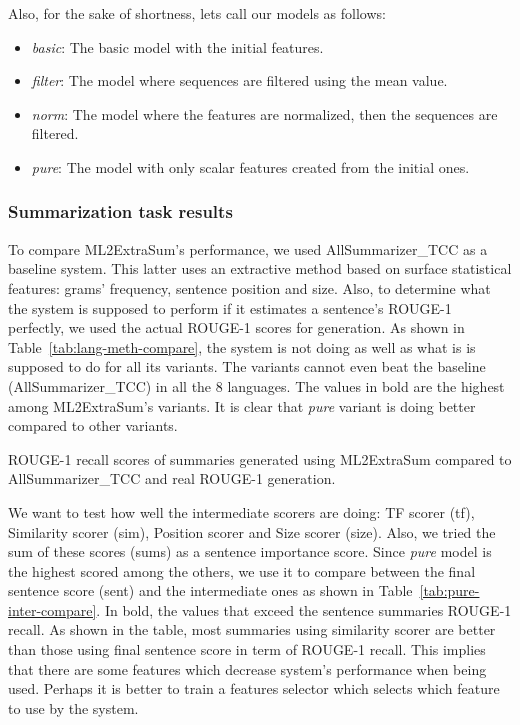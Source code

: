 Also, for the sake of shortness, lets call our models as follows:
\begin{itemize}
	\item \textit{basic}: The basic model with the initial features.
	\item \textit{filter}: The model where sequences are filtered using the mean value.
	\item \textit{norm}: The model where the features are normalized, then the sequences are filtered. 
	\item \textit{pure}: The model with only scalar features created from the initial ones.
\end{itemize}

\subsubsection{Summarization task results}


To compare ML2ExtraSum's performance, we used AllSummarizer\_TCC as a baseline system. 
This latter uses an extractive method based on surface statistical features: grams' frequency, sentence position and size. 
Also, to determine what the system is supposed to perform if it estimates a sentence's ROUGE-1 perfectly, we used the actual ROUGE-1 scores for generation. 
As shown in Table~\ref{tab:lang-meth-compare}, the system is not doing as well as what is is supposed to do for all its variants. 
The variants cannot even beat the baseline (AllSummarizer\_TCC) in all the 8 languages.  
The values in bold are the highest among ML2ExtraSum's variants. 
It is clear that \textit{pure} variant is doing better compared to other variants. 

\begin{table}[!ht]
	\centering
	\small
	\caption{ROUGE-1 recall scores of summaries generated using ML2ExtraSum compared to AllSummarizer\_TCC and real ROUGE-1 generation.}
	\label{tab:lang-meth-compare}
\end{table}


We want to test how well the intermediate scorers are doing: TF scorer (tf), Similarity scorer (sim), Position scorer and Size scorer (size). 
Also, we tried the sum of these scores (sums) as a sentence importance score. 
Since \textit{pure} model is the highest scored among the others, we use it to compare between the final sentence score (sent) and the intermediate ones as shown in Table~\ref{tab:pure-inter-compare}.
In bold, the values that exceed the sentence summaries ROUGE-1 recall.
As shown in the table, most summaries using similarity scorer are better than those using final sentence score in term of ROUGE-1 recall. 
This implies that there are some features which decrease system's performance when being used. 
Perhaps it is better to train a features selector which selects which feature to use by the system.

